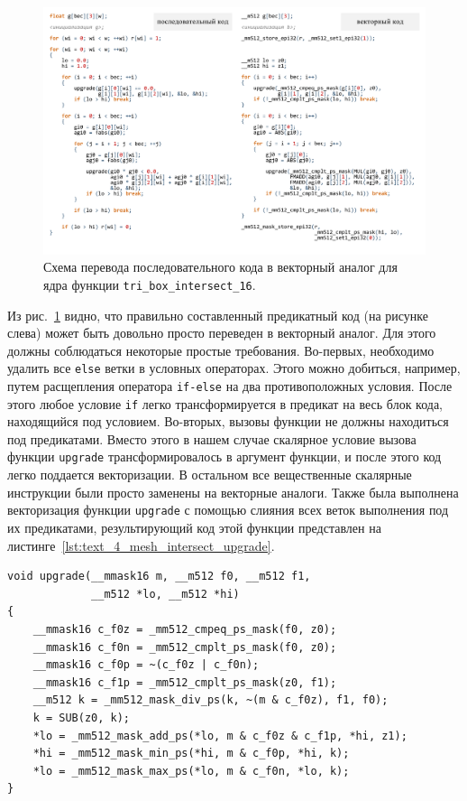 \begin{figure}[ht]
\centering
\includegraphics[width=1.0\textwidth]{./pics/text_4_mesh_intersect/final_scheme.pdf}
\singlespacing
{}\caption{Схема перевода последовательного кода в векторный аналог для ядра функции \texttt{tri\_box\_intersect\_16}.}
\label{fig:text_1_mesh_intersect_scheme}
\end{figure}

Из рис.~\ref{fig:text_1_mesh_intersect_scheme} видно, что правильно составленный предикатный код (на рисунке слева) может быть довольно просто переведен в векторный аналог.
Для этого должны соблюдаться некоторые простые требования.
Во-первых, необходимо удалить все \texttt{else} ветки в условных операторах.
Этого можно добиться, например, путем расщепления оператора \texttt{if-else} на два противоположных условия.
После этого любое условие \texttt{if} легко трансформируется в предикат на весь блок кода, находящийся под условием.
Во-вторых, вызовы функции не должны находиться под предикатами.
Вместо этого в нашем случае скалярное условие вызова функции \texttt{upgrade} трансформировалось в аргумент функции, и после этого код легко поддается векторизации.
В остальном все вещественные скалярные инструкции были просто заменены на векторные аналоги.
Также была выполнена векторизация функции \texttt{upgrade} с помощью слияния всех веток выполнения под их предикатами\label{term:meth_vec_merge2}, результирующий код этой функции представлен на листинге~\ref{lst:text_4_mesh_intersect_upgrade}.

\begin{singlespace}
\begin{lstlisting}[caption={Векторная реализация функции upgrade с пропагированным условием вызова внутрь функции.},label={lst:text_4_mesh_intersect_upgrade}]
void upgrade(__mmask16 m, __m512 f0, __m512 f1,
             __m512 *lo, __m512 *hi)
{
    __mmask16 c_f0z = _mm512_cmpeq_ps_mask(f0, z0);
    __mmask16 c_f0n = _mm512_cmplt_ps_mask(f0, z0);
    __mmask16 c_f0p = ~(c_f0z | c_f0n);
    __mmask16 c_f1p = _mm512_cmplt_ps_mask(z0, f1);
    __m512 k = _mm512_mask_div_ps(k, ~(m & c_f0z), f1, f0);
    k = SUB(z0, k);
    *lo = _mm512_mask_add_ps(*lo, m & c_f0z & c_f1p, *hi, z1);
    *hi = _mm512_mask_min_ps(*hi, m & c_f0p, *hi, k);
    *lo = _mm512_mask_max_ps(*lo, m & c_f0n, *lo, k);
}
\end{lstlisting}
\end{singlespace}

